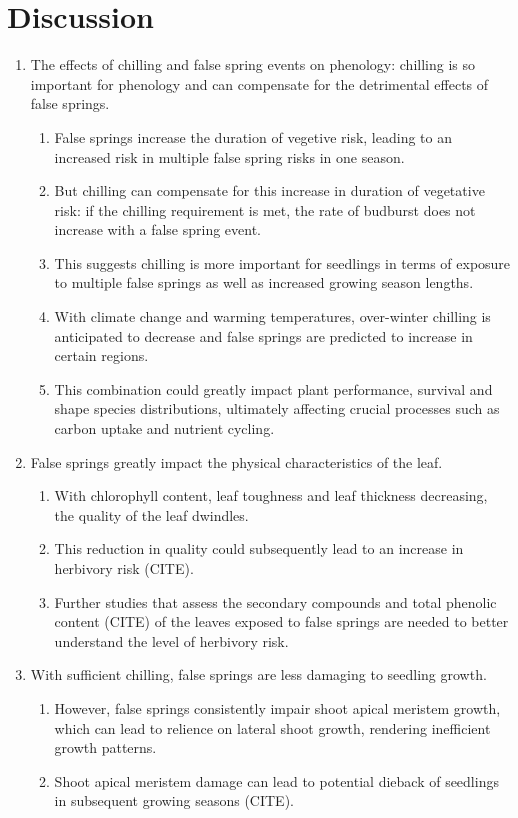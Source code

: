 \documentclass{article}\usepackage[]{graphicx}\usepackage[]{color}
\begin{document}
\section*{Discussion}
\begin{enumerate}
\item The effects of chilling and false spring events on phenology: chilling is so important for phenology and can compensate for the detrimental effects of false springs.
  \begin{enumerate}
  \item False springs increase the duration of vegetive risk, leading to an increased risk in multiple false spring risks in one season.
  \item But chilling can compensate for this increase in duration of vegetative risk: if the chilling requirement is met, the rate of budburst does not increase with a false spring event.
  \item This suggests chilling is more important for seedlings in terms of exposure to multiple false springs as well as increased growing season lengths.
  \item With climate change and warming temperatures, over-winter chilling is anticipated to decrease and false springs are predicted to increase in certain regions.
  \item This combination could greatly impact plant performance, survival and shape species distributions, ultimately affecting crucial processes such as carbon uptake and nutrient cycling.
  \end{enumerate}
  
\item False springs greatly impact the physical characteristics of the leaf.
  \begin{enumerate}
  \item With chlorophyll content, leaf toughness and leaf thickness decreasing, the quality of the leaf dwindles.
  \item This reduction in quality could subsequently lead to an increase in herbivory risk (CITE).
  \item Further studies that assess the secondary compounds and total phenolic content (CITE) of the leaves exposed to false springs are needed to better understand the level of herbivory risk. 
  \end{enumerate}
  
\item With sufficient chilling, false springs are less damaging to seedling growth.
  \begin{enumerate}
  \item However, false springs consistently impair shoot apical meristem growth, which can lead to relience on lateral shoot growth, rendering inefficient growth patterns.
  \item Shoot apical meristem damage can lead to potential dieback of seedlings in subsequent growing seasons (CITE). 
  \end{enumerate}
  

\end{enumerate}
\end{document}
